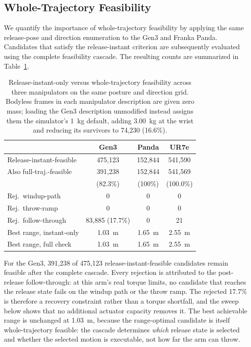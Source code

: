 \documentclass[letterpaper, 10 pt, conference]{ieeeconf}
\begin{document}
\subsection{Whole-Trajectory Feasibility}
\label{sec:results-ablation}

We quantify the importance of whole-trajectory feasibility by applying the same
release-pose and direction enumeration to the Gen3 and Franka Panda. Candidates
that satisfy the release-instant criterion are subsequently evaluated using the
complete feasibility cascade. The resulting counts are summarized in
Table~\ref{tab:ablation}.

\begin{table}[t]
\centering
\small
\caption{Release-instant-only versus whole-trajectory feasibility across three
manipulators on the same posture and direction grid. Bodyless frames in each
manipulator description are given zero mass; loading the Gen3 description
unmodified instead assigns them the simulator's 1~kg default, adding 3.00~kg at
the wrist and reducing its survivors to 74{,}230 (16.6\%).}
\label{tab:ablation}
\begin{tabular}{@{}lccc@{}}
\toprule
 & Gen3 & Panda & UR7e \\
\midrule
Release-instant-feasible & 475{,}123 & 152{,}844 & 541{,}590 \\
Also full-traj.-feasible & 391{,}238 & 152{,}844 & 541{,}569 \\
                         & (82.3\%) & (100\%) & (100.0\%) \\
Rej.\ windup-path & 0 & 0 & 0 \\
Rej.\ throw-ramp & 0 & 0 & 0 \\
Rej.\ follow-through & 83{,}885 (17.7\%) & 0 & 21 \\
Best range, instant-only & 1.03~m & 1.65~m & 2.55~m \\
Best range, full check & 1.03~m & 1.65~m & 2.55~m \\
\bottomrule
\end{tabular}
\end{table}

For the Gen3, 391{,}238 of 475{,}123 release-instant-feasible candidates remain
feasible after the complete cascade. Every rejection is attributed to the
post-release follow-through: at this arm's real torque limits, no candidate that
reaches the release state fails on the windup path or the throw ramp. The
rejected 17.7\% is therefore a recovery constraint rather than a torque
shortfall, and the sweep below shows that no additional actuator capacity
removes it. The best achievable range is unchanged at 1.03~m, because the
range-optimal candidate is itself whole-trajectory feasible: the cascade
determines \emph{which} release state is selected and whether the selected
motion is executable, not how far the arm can throw.
\end{document}
